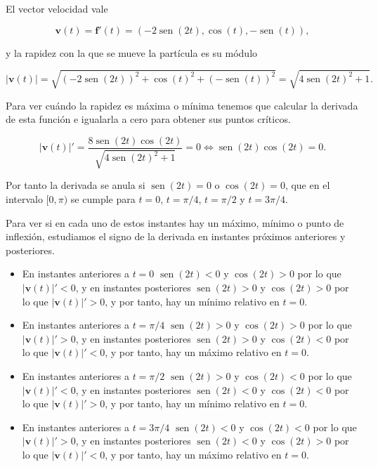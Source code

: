 \documentclass[
  spanish,
  a4paper,
]{scrreport}
\providecommand{\tightlist}{%
  \setlength{\itemsep}{0pt}\setlength{\parskip}{0pt}}
\theoremstyle{definition}
\theoremstyle{remark}
\begin{document}
\begin{tcolorbox}[enhanced jigsaw, arc=.35mm, bottomrule=.15mm, bottomtitle=1mm, breakable, colback=white, colbacktitle=quarto-callout-tip-color!10!white, colframe=quarto-callout-tip-color-frame, coltitle=black, left=2mm, leftrule=.75mm, opacityback=0, opacitybacktitle=0.6, rightrule=.15mm, title=\textcolor{quarto-callout-tip-color}{\faLightbulb}\hspace{0.5em}{Solución}, titlerule=0mm, toprule=.15mm, toptitle=1mm]

El vector velocidad vale

\[
\mathbf{v}(t)
= \mathbf{f}'(t) 
= (-2\operatorname{sen}(2t), \cos(t), -\operatorname{sen}(t)),
\]

y la rapidez con la que se mueve la partícula es su módulo

\[
|\mathbf{v}(t)| 
= \sqrt{(-2\operatorname{sen}(2t))^2 + \cos(t)^2 + (-\operatorname{sen}(t))^2}
= \sqrt{4\operatorname{sen}(2t)^2+1}.
\]

Para ver cuándo la rapidez es máxima o mínima tenemos que calcular la
derivada de esta función e igualarla a cero para obtener sus puntos
críticos.

\[
|\mathbf{v}(t)|'
= \frac{8\operatorname{sen}(2t)\cos(2t)}{\sqrt{4\operatorname{sen}(2t)^2+1}} = 0
\Leftrightarrow
\operatorname{sen}(2t)\cos(2t) = 0.
\]

Por tanto la derivada se anula si \(\operatorname{sen}(2t)=0\) o
\(\cos(2t)=0\), que en el intervalo \([0,\pi)\) se cumple para \(t=0\),
\(t=\pi/4\), \(t=\pi/2\) y \(t=3\pi/4\).

Para ver si en cada uno de estos instantes hay un máximo, mínimo o punto
de inflexión, estudiamos el signo de la derivada en instantes próximos
anteriores y posteriores.

\begin{itemize}
\tightlist
\item
  En instantes anteriores a \(t=0\) \(\operatorname{sen}(2t)<0\) y
  \(\cos(2t)>0\) por lo que \(|\mathbf{v}(t)|'<0\), y en instantes
  posteriores \(\operatorname{sen}(2t)>0\) y \(\cos(2t)>0\) por lo que
  \(|\mathbf{v}(t)|'>0\), y por tanto, hay un mínimo relativo en
  \(t=0\).
\item
  En instantes anteriores a \(t=\pi/4\) \(\operatorname{sen}(2t)>0\) y
  \(\cos(2t)>0\) por lo que \(|\mathbf{v}(t)|'>0\), y en instantes
  posteriores \(\operatorname{sen}(2t)>0\) y \(\cos(2t)<0\) por lo que
  \(|\mathbf{v}(t)|'<0\), y por tanto, hay un máximo relativo en
  \(t=0\).
\item
  En instantes anteriores a \(t=\pi/2\) \(\operatorname{sen}(2t)>0\) y
  \(\cos(2t)<0\) por lo que \(|\mathbf{v}(t)|'<0\), y en instantes
  posteriores \(\operatorname{sen}(2t)<0\) y \(\cos(2t)<0\) por lo que
  \(|\mathbf{v}(t)|'>0\), y por tanto, hay un mínimo relativo en
  \(t=0\).
\item
  En instantes anteriores a \(t=3\pi/4\) \(\operatorname{sen}(2t)<0\) y
  \(\cos(2t)<0\) por lo que \(|\mathbf{v}(t)|'>0\), y en instantes
  posteriores \(\operatorname{sen}(2t)<0\) y \(\cos(2t)>0\) por lo que
  \(|\mathbf{v}(t)|'<0\), y por tanto, hay un máximo relativo en
  \(t=0\).
\end{itemize}


\end{tcolorbox}
\end{document}
